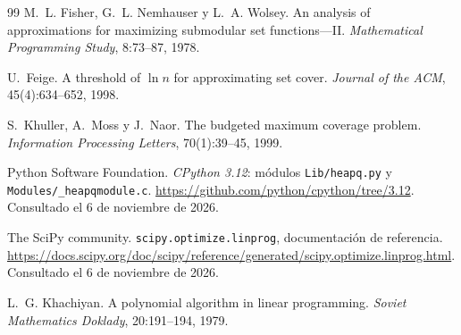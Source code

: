 \begin{thebibliography}{99}
M.~L. Fisher, G.~L. Nemhauser y L.~A. Wolsey.
\newblock An analysis of approximations for maximizing submodular set functions---II.
\newblock \emph{Mathematical Programming Study}, 8:73--87, 1978.

U.~Feige.
\newblock A threshold of $\ln n$ for approximating set cover.
\newblock \emph{Journal of the ACM}, 45(4):634--652, 1998.

S.~Khuller, A.~Moss y J.~Naor.
\newblock The budgeted maximum coverage problem.
\newblock \emph{Information Processing Letters}, 70(1):39--45, 1999.

Python Software Foundation.
\newblock \emph{CPython 3.12}: módulos \texttt{Lib/heapq.py} y \texttt{Modules/\_heapqmodule.c}.
\newblock \url{https://github.com/python/cpython/tree/3.12}. Consultado el 6 de noviembre de 2026.

The SciPy community.
\newblock \texttt{scipy.optimize.linprog}, documentación de referencia.
\newblock \url{https://docs.scipy.org/doc/scipy/reference/generated/scipy.optimize.linprog.html}. Consultado el 6 de noviembre de 2026.

L.~G. Khachiyan.
\newblock A polynomial algorithm in linear programming.
\newblock \emph{Soviet Mathematics Doklady}, 20:191--194, 1979. \VER{}

\end{thebibliography}
